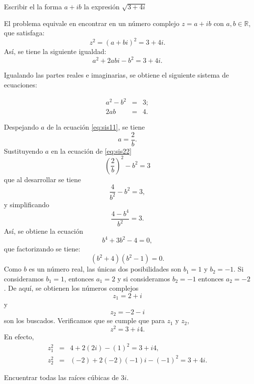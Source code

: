 \documentclass[twoside]{book}
\begin{document}
\begin{example}{}
    Escribir el la forma $a+ib$ la expresi\'on $\sqrt{3+4i}$
\end{example}
\begin{sol}
    \begin{solucion}{}
        El problema equivale en encontrar en un n\'umero complejo $z=a+ib$ con $a,b\in\mathbb R$, que satisfaga:
        $$z^{2}=(a+bi)^{2}=3+4i.$$
        As\'i, se tiene la siguiente igualdad:
        $$a^{2}+2abi-b^{2}=3+4i.$$

        Igualando las partes reales e imaginarias, se obtiene el siguiente sistema de ecuaciones:

        \begin{eqnarray}\label{eq:sis}
            a^{2}-b^{2}&=&3;\label{eq:sis11}\\
            2ab&=&4.\label{eq:sis22}
        \end{eqnarray}

        Despejando $a$ de la ecuaci\'on \eqref{eq:sis11}, se tiene
        \begin{equation}
            a=\frac{2}{b}.
        \end{equation}
        Sustituyendo $a$ en la ecuaci\'on de \eqref{eq:sis22}
        $$\left(\frac{2}{b}\right)^{2}-b^{2}=3$$
        que al desarrollar se tiene
        $$
            \frac{4}{b^{2}}-b^{2}=3,$$
        y simplificando
        $$\frac{4-b^{4}}{b^{2}}=3.$$
        As\'i, se obtiene la ecuaci\'on
        $$b^{4}+3b^{2}-4=0,$$
        que factorizando se tiene:
        $$(b^{2}+4)(b^{2}-1)=0.$$
        Como $b$ es un n\'umero real, las \'unicas dos posibilidades son
        $b_1 = 1$ y  $b_2 = -1$. Si consideramos $b_1 = 1$, entonces $a_1=2$ y si consideramos $b_2=-1$ entonces $a_2=-2$.
        De aqu\'i, se obtienen los n\'umeros complejos
        $$z_1 = 2 + i $$ y $$z_2 = -2 -i $$
        son los buscados. Verificamos que se cumple que para $z_1$ y $z_2$,
        $$
            z^{2} = 3 + i4.$$
        En efecto,
        \begin{eqnarray*}
            z_1^{2} &=&4 + 2(2i) - (1)^{2} =3 + i4, \\
            z^{2}_2 &=&(-2) + 2(-2)(-1)i - (-1)^{2} = 3 + 4i.
        \end{eqnarray*}
    \end{solucion}
\end{sol}
\begin{example}{}
    Encuentrar todas las ra\'ices c\'ubicas de $3i$.

\end{example}
\end{document}
